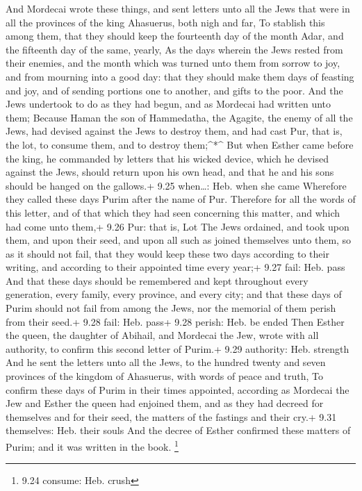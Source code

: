  And Mordecai wrote these things, and sent letters unto all
the Jews that were in all the provinces of the king Ahasuerus, both nigh
and far,  To stablish this among them, that they should
keep the fourteenth day of the month Adar, and the fifteenth day of the
same, yearly,  As the days wherein the Jews rested from
their enemies, and the month which was turned unto them from sorrow to
joy, and from mourning into a good day: that they should make them days
of feasting and joy, and of sending portions one to another, and gifts
to the poor.  And the Jews undertook to do as they had
begun, and as Mordecai had written unto them;  Because
Haman the son of Hammedatha, the Agagite, the enemy of all the Jews, had
devised against the Jews to destroy them, and had cast Pur, that is, the
lot, to consume them, and to destroy them;\^{}*\^{}  But
when Esther came before the king, he commanded by letters that his
wicked device, which he devised against the Jews, should return upon his
own head, and that he and his sons should be hanged on the gallows.+
9.25 when\ldots: Heb. when she came  Wherefore they called
these days Purim after the name of Pur. Therefore for all the words of
this letter, and of that which they had seen concerning this matter, and
which had come unto them,+ 9.26 Pur: that is, Lot  The Jews
ordained, and took upon them, and upon their seed, and upon all such as
joined themselves unto them, so as it should not fail, that they would
keep these two days according to their writing, and according to their
appointed time every year;+ 9.27 fail: Heb. pass  And that
these days should be remembered and kept throughout every generation,
every family, every province, and every city; and that these days of
Purim should not fail from among the Jews, nor the memorial of them
perish from their seed.+ 9.28 fail: Heb. pass+ 9.28 perish: Heb. be
ended  Then Esther the queen, the daughter of Abihail, and
Mordecai the Jew, wrote with all authority, to confirm this second
letter of Purim.+ 9.29 authority: Heb. strength  And he
sent the letters unto all the Jews, to the hundred twenty and seven
provinces of the kingdom of Ahasuerus, with words of peace and truth,
 To confirm these days of Purim in their times appointed,
according as Mordecai the Jew and Esther the queen had enjoined them,
and as they had decreed for themselves and for their seed, the matters
of the fastings and their cry.+ 9.31 themselves: Heb. their souls
 And the decree of Esther confirmed these matters of Purim;
and it was written in the book. \footnote{9.24 consume: Heb. crush}

